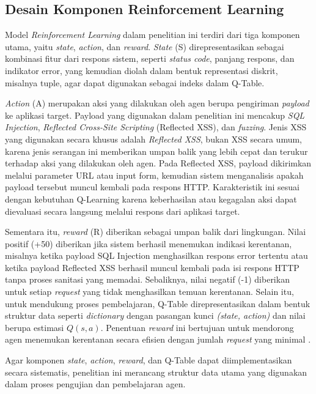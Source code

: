 \subsection{Desain Komponen Reinforcement Learning}

Model \textit{Reinforcement Learning} dalam penelitian ini terdiri dari tiga komponen utama, yaitu \textit{state}, \textit{action}, dan \textit{reward}. \textit{State} (S) direpresentasikan sebagai kombinasi fitur dari respons sistem, seperti \textit{status code}, panjang respons, dan indikator error, yang kemudian diolah dalam bentuk representasi diskrit, misalnya tuple, agar dapat digunakan sebagai indeks dalam Q-Table.

\textit{Action} (A) merupakan aksi yang dilakukan oleh agen berupa pengiriman \textit{payload} ke aplikasi target. Payload yang digunakan dalam penelitian ini mencakup \textit{SQL Injection}, \textit{Reflected Cross-Site Scripting} (Reflected XSS), dan \textit{fuzzing}. Jenis XSS yang digunakan secara khusus adalah \textit{Reflected XSS}, bukan XSS secara umum, karena jenis serangan ini memberikan umpan balik yang lebih cepat dan terukur terhadap aksi yang dilakukan oleh agen. Pada Reflected XSS, payload dikirimkan melalui parameter URL atau input form, kemudian sistem menganalisis apakah payload tersebut muncul kembali pada respons HTTP. Karakteristik ini sesuai dengan kebutuhan Q-Learning karena keberhasilan atau kegagalan aksi dapat dievaluasi secara langsung melalui respons dari aplikasi target.

Sementara itu, \textit{reward} (R) diberikan sebagai umpan balik dari lingkungan. Nilai positif (+50) diberikan jika sistem berhasil menemukan indikasi kerentanan, misalnya ketika payload SQL Injection menghasilkan respons error tertentu atau ketika payload Reflected XSS berhasil muncul kembali pada isi respons HTTP tanpa proses sanitasi yang memadai. Sebaliknya, nilai negatif (-1) diberikan untuk setiap \textit{request} yang tidak menghasilkan temuan kerentanan. Selain itu, untuk mendukung proses pembelajaran, Q-Table direpresentasikan dalam bentuk struktur data seperti \textit{dictionary} dengan pasangan kunci \textit{(state, action)} dan nilai berupa estimasi $Q(s,a)$. Penentuan \textit{reward} ini bertujuan untuk mendorong agen menemukan kerentanan secara efisien dengan jumlah \textit{request} yang minimal \cite{nguyen2023}.

Agar komponen \textit{state}, \textit{action}, \textit{reward}, dan Q-Table dapat diimplementasikan secara sistematis, penelitian ini merancang struktur data utama yang digunakan dalam proses pengujian dan pembelajaran agen.


